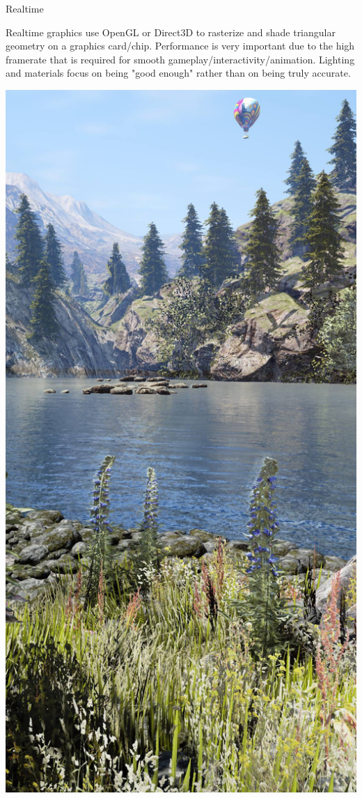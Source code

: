 \documentclass{lug}
\begin{document}
\begin{frame}{Realtime}
    \noindent
    \begin{minipage}{.7\textwidth - 1.5em}
        \small

        Realtime graphics use OpenGL or Direct3D to rasterize and shade
        triangular geometry on a graphics card/chip. Performance is very
        important due to the high framerate that is required for smooth
        gameplay/interactivity/animation. Lighting and materials focus on
        being "good enough" rather than on being truly accurate.

    \end{minipage}%
    \hspace{1.5em}%
    \begin{minipage}{.3\textwidth}
        \includegraphics[width=\textwidth]{graphics/game_graphics}
    \end{minipage}
\end{frame}
\end{document}
